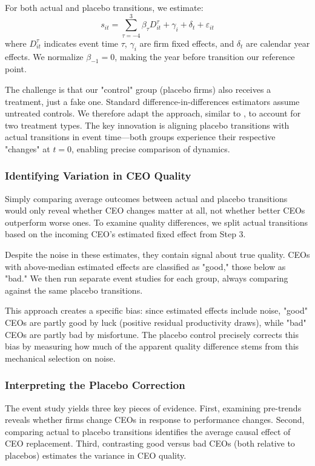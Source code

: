 \documentclass[11pt,a4paper]{article}
\begin{document}
For both actual and placebo transitions, we estimate:
\begin{equation}
s_{it} = \sum_{\tau=-4}^{3} \beta_\tau D_{it}^\tau + \gamma_i + \delta_t + \varepsilon_{it}
\end{equation}
where $D_{it}^\tau$ indicates event time $\tau$, $\gamma_i$ are firm fixed effects, and $\delta_t$ are calendar year effects. We normalize $\beta_{-1} = 0$, making the year before transition our reference point.

The challenge is that our "control" group (placebo firms) also receives a treatment, just a fake one. Standard difference-in-differences estimators assume untreated controls. We therefore adapt the approach, similar to \citet{Callaway2021JoLE}, to account for two treatment types. The key innovation is aligning placebo transitions with actual transitions in event time—both groups experience their respective "changes" at $t=0$, enabling precise comparison of dynamics.

\subsubsection{Identifying Variation in CEO Quality}

Simply comparing average outcomes between actual and placebo transitions would only reveal whether CEO changes matter at all, not whether better CEOs outperform worse ones. To examine quality differences, we split actual transitions based on the incoming CEO's estimated fixed effect from Step 3.

Despite the noise in these estimates, they contain signal about true quality. CEOs with above-median estimated effects are classified as "good," those below as "bad." We then run separate event studies for each group, always comparing against the same placebo transitions.

This approach creates a specific bias: since estimated effects include noise, "good" CEOs are partly good by luck (positive residual productivity draws), while "bad" CEOs are partly bad by misfortune. The placebo control precisely corrects this bias by measuring how much of the apparent quality difference stems from this mechanical selection on noise.

\subsubsection{Interpreting the Placebo Correction}

The event study yields three key pieces of evidence. First, examining pre-trends reveals whether firms change CEOs in response to performance changes. Second, comparing actual to placebo transitions identifies the average causal effect of CEO replacement. Third, contrasting good versus bad CEOs (both relative to placebos) estimates the variance in CEO quality.
\end{document}

